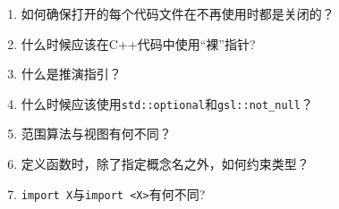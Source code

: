 \begin{enumerate}
\item 如何确保打开的每个代码文件在不再使用时都是关闭的？
\item 什么时候应该在C++代码中使用“裸”指针?
\item 什么是推演指引？
\item 什么时候应该使用\texttt{std::optional}和\texttt{gsl::not\_null}？
\item 范围算法与视图有何不同？
\item 定义函数时，除了指定概念名之外，如何约束类型？
\item \texttt{import X}与\texttt{import <X>}有何不同?
\end{enumerate}